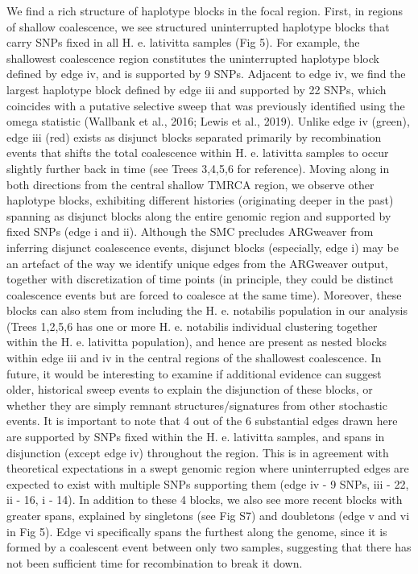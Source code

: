\documentclass[twocolumn]{bmcart}%
\begin{document}
 We find a rich structure of haplotype blocks in the focal region. First, in regions of shallow coalescence, we see structured uninterrupted haplotype blocks that carry SNPs fixed in all H. e. lativitta samples (Fig 5). For example, the shallowest coalescence region constitutes the uninterrupted haplotype block defined by edge iv, and is supported by 9 SNPs. Adjacent to edge iv, we find the largest haplotype block defined by edge iii and supported by 22 SNPs, which coincides with a putative selective sweep that was previously identified using the omega statistic (Wallbank et al., 2016; Lewis et al., 2019). Unlike edge iv (green), edge iii (red) exists as disjunct blocks separated primarily by recombination events that shifts the total coalescence within H. e. lativitta samples to occur slightly further back in time (see Trees 3,4,5,6 for reference). Moving along in both directions from the central shallow TMRCA region, we observe other haplotype blocks, exhibiting different histories (originating deeper in the past) spanning as disjunct blocks along the entire genomic region and supported by fixed SNPs (edge i and ii). Although the SMC precludes ARGweaver from inferring disjunct coalescence events, disjunct blocks (especially, edge i) may be an artefact of the way we identify unique edges from the ARGweaver output, together with discretization of time points (in principle, they could be distinct coalescence events but are forced to coalesce at the same time). Moreover, these blocks can also stem from including the H. e. notabilis population in our analysis (Trees 1,2,5,6 has one or more H. e. notabilis individual clustering together within the H. e. lativitta population), and hence are present as nested blocks within edge iii and iv in the central regions of the shallowest coalescence. In future, it would be interesting to examine if additional evidence can suggest older, historical sweep events to explain the disjunction of these blocks, or whether they are simply remnant structures/signatures from other stochastic events. It is important to note that 4 out of the 6 substantial edges drawn here are supported by SNPs fixed within the H. e. lativitta samples, and spans in disjunction (except edge iv) throughout the region. This is in agreement with theoretical expectations in a swept genomic region where uninterrupted edges are expected to exist with multiple SNPs supporting them (edge iv - 9 SNPs, iii - 22, ii - 16, i - 14). In addition to these 4 blocks, we also see more recent blocks with greater spans, explained by singletons (see Fig S7) and doubletons (edge v and vi in Fig 5). Edge vi specifically spans the furthest along the genome, since it is formed by a coalescent event between only two samples, suggesting that there has not been sufficient time for recombination to break it down. 
\end{document}
